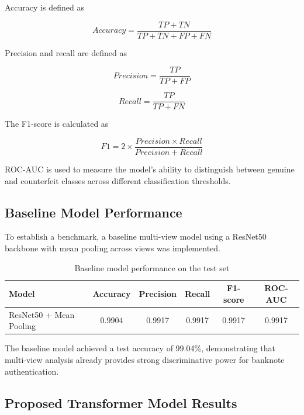 \documentclass[preprint,12pt,authoryear]{elsarticle}
\begin{document}
Accuracy is defined as

\begin{equation}
Accuracy = \frac{TP + TN}{TP + TN + FP + FN}
\end{equation}

Precision and recall are defined as

\begin{equation}
Precision = \frac{TP}{TP + FP}
\end{equation}

\begin{equation}
Recall = \frac{TP}{TP + FN}
\end{equation}

The F1-score is calculated as

\begin{equation}
F1 = 2 \times \frac{Precision \times Recall}{Precision + Recall}
\end{equation}

ROC-AUC is used to measure the model's ability to distinguish between genuine and counterfeit classes across different classification thresholds.


\subsection{Baseline Model Performance}

To establish a benchmark, a baseline multi-view model using a ResNet50 backbone with mean pooling across views was implemented.

\begin{table}[h]
\centering
\caption{Baseline model performance on the test set}
\begin{tabular}{lccccc}
\hline
Model & Accuracy & Precision & Recall & F1-score & ROC-AUC \\
\hline
ResNet50 + Mean Pooling & 0.9904 & 0.9917 & 0.9917 & 0.9917 & 0.9917 \\
\hline
\end{tabular}
\end{table}

The baseline model achieved a test accuracy of 99.04\%, demonstrating that multi-view analysis already provides strong discriminative power for banknote authentication.

\subsection{Proposed Transformer Model Results}
\end{document}
